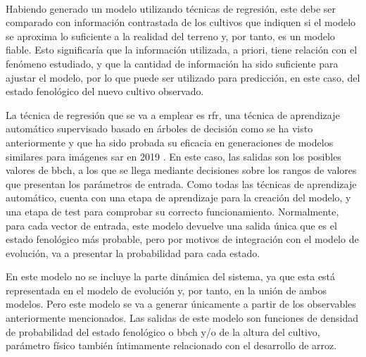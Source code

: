 \\
\par Habiendo generado un modelo utilizando técnicas de regresión, este debe ser comparado con información contrastada de los cultivos que indiquen si el modelo se aproxima lo suficiente a la realidad del terreno y, por tanto, es un modelo fiable. Esto significaría que la información utilizada, a priori, tiene relación con el fenómeno estudiado, y que la cantidad de información ha sido suficiente para ajustar el modelo, por lo que puede ser utilizado para predicción, en este caso, del estado fenológico del nuevo cultivo observado. 
\\
\par La técnica de regresión que se va a emplear es \gls{rfr}, una técnica de aprendizaje automático supervisado basado en árboles de decisión como se ha visto anteriormente y que ha sido probada su eficacia en generaciones de modelos similares para imágenes \gls{sar} en 2019 \cite{artRF}. En este caso, las salidas son los posibles valores de \gls{bbch}, a los que se llega mediante decisiones sobre los rangos de valores que presentan los parámetros de entrada. Como todas las técnicas de aprendizaje automático, cuenta con una etapa de aprendizaje para la creación del modelo, y una etapa de test para comprobar su correcto funcionamiento. Normalmente, para cada vector de entrada, este modelo devuelve una salida única que es el estado fenológico más probable, pero por motivos de integración con el modelo de evolución, va a presentar la probabilidad para cada estado. 
\\
\par En este modelo no se incluye la parte dinámica del sistema, ya que esta está representada en el modelo de evolución y, por tanto, en la unión de ambos modelos. Pero este modelo se va a generar únicamente a partir de los observables anteriormente mencionados. Las salidas de este modelo son funciones de densidad de probabilidad del estado fenológico o \gls{bbch} y/o de la altura del cultivo, parámetro físico también íntimamente relacionado con el desarrollo de arroz. 